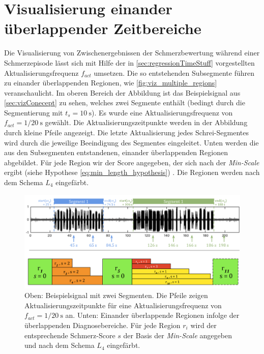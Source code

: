  
\section{Visualisierung einander überlappender Zeitbereiche}
\label{sec:vizWithOverlap}
 
Die Visualisierung von \glqq Zwischenergebnissen\grqq{} der Schmerzbewertung während einer Schmerzepisode lässt sich mit Hilfe der in \autoref{sec:regressionTimeStuff} vorgestellten Aktualisierungsfrequenz $f_{act}$ umsetzen. Die so entstehenden Subsegmente führen zu einander überlappenden Regionen, wie \autoref{fig:viz_multiple_regions} veranschaulicht. Im oberen Bereich der Abbildung ist das Beispielsignal aus \autoref{sec:vizConecept} zu sehen, welches zwei Segmente enthält (bedingt durch die Segmentierung mit $t_s = \SI{10}{\second}$). Es wurde eine Aktualisierungsfrequenz von  $f_{act} = 1/ \SI{20}{\second}$ gewählt. Die Aktualisierungszeitpunkte werden in der Abbildung durch kleine Pfeile angezeigt. Die letzte Aktualisierung jedes Schrei-Segmentes wird durch die jeweilige Beeindigung des Segmentes eingeleitet. Unten werden die aus den Subsegmenten entstandenen, einander überlappenden Regionen abgebildet. Für jede Region wir der Score angegeben, der sich nach der \emph{Min-Scale} ergibt (siehe Hypothese \autoref{eq:min_length_hypothesis}) . Die Regionen werden nach dem Schema $L_4$ eingefärbt.

\begin{figure}[h]
	\centering
	\includegraphics[width=1\textwidth]{bilder/viz-multiple-regions.png}
	\caption[Ein Beispielsignal mit zeitlich einander überlappenden Diagnosebereichen]{Oben: Beispielsignal mit zwei Segmenten. Die Pfeile zeigen Aktualisierungszeitpunkte für eine Aktualisierungsfrequenz von $f_{act} = 1/ \SI{20}{\second}$ an. Unten: Einander überlappende Regionen infolge der überlappenden Diagnosebereiche. Für jede Region $r_i$ wird der entsprechende Schmerz-Score $s$ der Basis der \emph{Min-Scale} angegeben und nach dem Schema $L_4$ eingefärbt.}
	\label{fig:viz_multiple_regions}
\end{figure}


